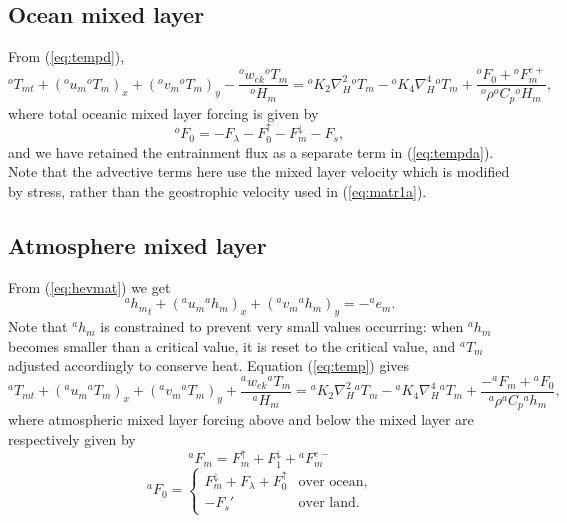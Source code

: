 \documentclass[11pt, a4paper,twoside]{article}
\newcommand{\rhb}[1]{{{}^{#1}\rho}}
\newcommand{\cp}[1]{{{}^{#1}C_p}}
\newcommand{\uu}[2]{{{}^{#1}u_{#2}}}
\newcommand{\vv}[2]{{{}^{#1}v_{#2}}}
\newcommand{\ek}[1]{{{}^{#1}w_{ek}}}
\newcommand{\HH}[2]{{{}^{#1}H_{#2}}}
\newcommand{\kh}[1]{{{}^{#1}K_2}}
\newcommand{\kf}[1]{{{}^{#1}K_4}}
\newcommand{\e}[2]{{{}^{#1}e_{#2}}}
\newcommand{\h}[2]{{{}^{#1}h_{#2}}}
\newcommand{\T}[2]{{{}^{#1}T_{#2}}}
\newcommand{\F}[3]{{{}^{#1}F^{#3}_{#2}}}
\newcommand{\Fup}[1]{{F^{\uparrow}_{#1}}}
\newcommand{\Fdown}[1]{{F^{\downarrow}_{#1}}}
\numberwithin{equation}{section}
\begin{document}
\subsection{Ocean mixed layer}
From (\ref{eq:tempd}),
\begin{equation}\label{eq:tempda}
\T{o}{mt} + (\uu{o}{m} \T{o}{m})_x + (\vv{o}{m} \T{o}{m})_y  - \frac{\ek{o} \T{o}{m}}{\HH{o}{m}} =  \kh{o}  \nabla_H^2\T{o}{m} - \kf{o}  \nabla_H^4 \T{o}{m}  + \frac{\F{o}{0}{} +  \F{o}{m}{e+}}{\rhb{o} \cp{o}\HH{o}{m} },
\end{equation}
where total oceanic mixed layer forcing is given by
\begin{equation}
\F{o}{0}{} = - F_{\lambda} - \Fup{0} - \Fdown{m} - F_s,
\end{equation}
and we have retained the entrainment flux as a separate term in (\ref{eq:tempda}).
Note that the advective terms here use the mixed layer velocity which is modified by stress, rather than the geostrophic velocity used in (\ref{eq:matr1a}).

\subsection{Atmosphere mixed layer}
From (\ref{eq:hevmat})  we get
\begin{equation}\label{eq:hevmata}
\h{a}{m}_t + (\uu{a}{m}\h{a}{m})_x + (\vv{a}{m} \h{a}{m})_y =   -\e{a}{m}.
\end{equation}
Note that $\h{a}{m}$ is constrained to prevent very small values occurring: when $\h{a}{m}$ becomes smaller than a critical value, it is reset to the critical value, and $\T{a}{m}$ adjusted accordingly to conserve heat.
Equation (\ref{eq:temp}) gives
\begin{equation}\label{eq:tempca}
\T{a}{mt} + (\uu{a}{m} \T{a}{m})_x + (\vv{a}{m} \T{a}{m})_y + \frac{\ek{a} \T{a}{m}}{\HH{a}{m}}  =  \kh{a} \nabla_H^2 \T{a}{m} - \kf{a}\nabla_H^4\T{a}{m} +\frac{-\F{a}{m}{} + \F{a}{0}{}}{\rhb{a} \cp{a} \h{a}{m}},
\end{equation}
where atmospheric  mixed layer forcing above and below the mixed layer are respectively given by
\begin{equation}\F{a}{m}{} = \Fup{m} + \Fdown{1} + \F{a}{m}{e-}\end{equation}
\begin{equation}\F{a}{0}{} = \begin{cases} \Fdown{m} + F_{\lambda} + \Fup{0} & \text{over ocean,}\\
-F_s' & \text{over land.}
\end{cases}\end{equation}
\end{document}
